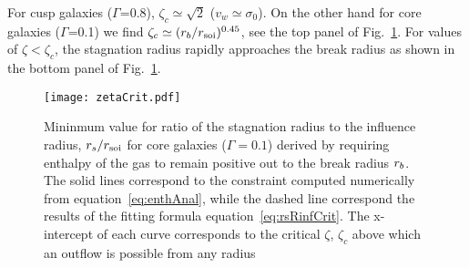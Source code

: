 For cusp galaxies ($\Gamma$=0.8), $\zeta_c\simeq \sqrt 2$
($v_w\simeq\sigma_0$).  On the other hand for core galaxies
($\Gamma$=0.1) we find $\zeta_c\simeq (r_b/r_{\rm soi})^{0.45}$, see the top
panel of Fig.~\ref{fig:zetaCrit}. For values of $\zeta<\zeta_c$, the
stagnation radius rapidly approaches the break radius as shown in the
bottom panel of Fig.~\ref{fig:zetaCrit}.



\begin{figure}
\texttt{[image: zetaCrit.pdf]}
\caption{\label{fig:zetaCrit} Mininmum value for ratio of the stagnation
  radius to the influence radius, $r_s/r_{\rm soi}$ for core galaxies
  ($\Gamma=0.1$) derived by requiring enthalpy of the gas to remain
  positive out to the break radius $r_b$. The solid lines correspond
  to the constraint computed numerically from
  equation~\eqref{eq:enthAnal}, while the dashed line correspond the
  results of the fitting formula equation~\eqref{eq:rsRinfCrit}. The
  x-intercept of each curve corresponds to the critical $\zeta$,
  $\zeta_c$ above which an outflow is possible from any radius}
\end{figure}


